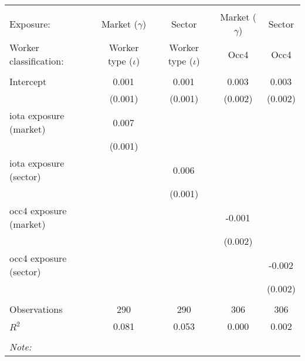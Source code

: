 \begin{tabular}{@{\extracolsep{5pt}}lcccc}
\\[-1.8ex]\hline
\hline \\[-1.8ex]
\hline \\[-1.8ex]
 Exposure: & Market ($\gamma$) & Sector & Market ($\gamma$) & Sector \\
 Worker classification: & Worker type ($\iota$) & Worker type ($\iota$) & Occ4 & Occ4 \\
 \hline &  &  &  &  \\
 Intercept & 0.001$^{}$ & 0.001$^{}$ & 0.003$^{}$ & 0.003$^{}$ \\
  & (0.001) & (0.001) & (0.002) & (0.002) \\
 iota exposure (market) & 0.007$^{}$ & & & \\
  & (0.001) & & & \\
 iota exposure (sector) & & 0.006$^{}$ & & \\
  & & (0.001) & & \\
 occ4 exposure (market) & & & -0.001$^{}$ & \\
  & & & (0.002) & \\
 occ4 exposure (sector) & & & & -0.002$^{}$ \\
  & & & & (0.002) \\
\hline \\[-1.8ex]
 Observations & 290 & 290 & 306 & 306 \\
 $R^2$ & 0.081 & 0.053 & 0.000 & 0.002 \\
\hline
\hline \\[-1.8ex]
\textit{Note:}\end{tabular}